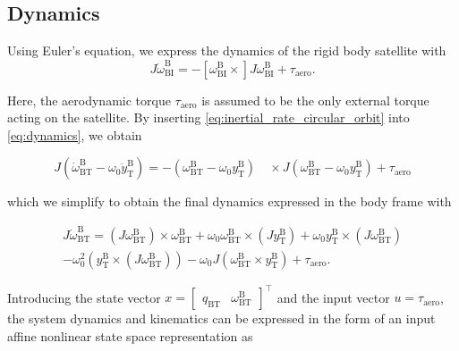 \documentclass[pdflatex,sn-mathphys-num]{sn-jnl}%
\theoremstyle{thmstyleone}%
\theoremstyle{thmstyletwo}%
\theoremstyle{thmstylethree}%
\begin{document}
    \subsection{Dynamics}
		Using Euler's equation, we express the dynamics of the rigid body satellite with
		\begin{equation}
			\label{eq:dynamics}
			J \dot{\omega}_{\text{BI}}^{\text{B}} = -[\omega_{\text{BI}}^{\text{B}}\times] J \omega_{\text{BI}}^{\text{B}} + \tau_{\text{aero}}.
		\end{equation}

		Here, the aerodynamic torque $\tau_{\text{aero}}$ is assumed to be the only external torque acting on the satellite.
		By inserting \cref{eq:inertial_rate_circular_orbit} into \cref{eq:dynamics}, we obtain

		\begin{equation}
			J \left( \dot{\omega}_{\text{BT}}^{\text{B}}  - \omega_0 \dot{y}^{\text{B}}_{\text{T}} \right)
			= -\left(\omega_{\text{BT}}^{\text{B}} - \omega_0 y^{\text{B}}_{\text{T}}\right)
			\quad \times J \left(\omega_{\text{BT}}^{\text{B}} - \omega_0 y^{\text{B}}_{\text{T}}\right) + \tau_{\text{aero}}
			\label{eq:dynamics_inserted}
		\end{equation}

		which we simplify to obtain the final dynamics expressed in the body frame with

		\begin{equation}
			\begin{split}
			J \dot{\omega}_{\text{BT}}^{\text{B}} 
			= \left(J\omega_{\text{BT}}^{\text{B}} \right) \times \omega_{\text{BT}}^{\text{B}} 
			+ \omega_0 \omega_{\text{BT}}^{\text{B}} \times \left( J y^{\text{B}}_{\text{T}} \right)
			+ \omega_0 y^{\text{B}}_{\text{T}} \times \left( J \omega_{\text{BT}}^{\text{B}}\right) \\
			- \omega_0^2 \left(  y^{\text{B}}_{\text{T}}  
				\times 
				\left( J \omega_{\text{BT}}^{\text{B}} \right)  \right)
			- \omega_0 J \left(  \omega_{\text{BT}}^{\text{B}} \times y^{\text{B}}_{\text{T}} \right) 
			+ \tau_{\text{aero}}.
			\end{split}
			\label{eq:dynamics_orbit_frame}
		\end{equation}

		Introducing the state vector $x = \begin{bmatrix}
			q_{\text{BT}} & \omega_{\text{BT}}^{\text{B}}\end{bmatrix}^{\top}$ and the input vector $u = \tau_{\text{aero}}$, the system dynamics and kinematics can be expressed in the form of an input affine nonlinear state space representation as
\end{document}
